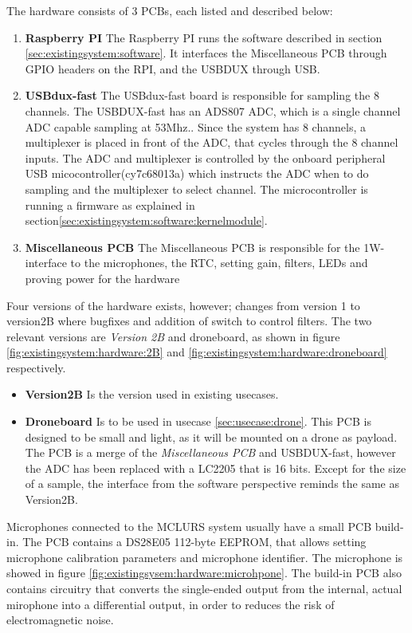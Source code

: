 
The hardware consists of 3 PCBs, each listed and described below:
\begin{enumerate}
	\item \textbf{Raspberry PI} The Raspberry PI runs the software described in section \ref{sec:existingsystem:software}. It interfaces the Miscellaneous PCB through GPIO headers on the RPI, and the USBDUX through USB.
	
	\item \textbf{USBdux-fast} The USBdux-fast board is responsible for sampling the 8 channels. The USBDUX-fast has an ADS807 ADC, which is a single channel ADC capable sampling at 53Mhz..
Since the system has 8 channels, a multiplexer is placed in front of the ADC, that cycles through the 8 channel inputs.
The ADC and multiplexer is controlled by the onboard peripheral USB micocontroller(cy7c68013a) which instructs the ADC when to do sampling and the multiplexer to select channel. The microcontroller is running a firmware as explained in section\ref{sec:existingsystem:software:kernelmodule}.
	
	\item \textbf{Miscellaneous PCB} The Miscellaneous PCB is responsible for the 1W-interface to the microphones, the RTC, setting gain, filters, LEDs and proving power for the hardware
\end{enumerate}

Four versions of the hardware exists, however; changes from version 1 to version2B where bugfixes and addition of switch to control filters. The two relevant versions are \textit{Version 2B} and droneboard, as shown in figure \ref{fig:existingsystem:hardware:2B} and \ref{fig:existingsystem:hardware:droneboard} respectively.

\begin{itemize}
	\item \textbf{Version2B} Is the version used in existing usecases. 

	\item \textbf{Droneboard} Is to be used in usecase \ref{sec:usecase:drone}. This PCB is designed to be small and light, as it will be mounted on a drone as payload. The PCB is a merge of the \textit{Miscellaneous PCB} and USBDUX-fast, however the ADC has been replaced with a LC2205 that is 16 bits. Except for the size of a sample, the interface from the software perspective reminds the same as Version2B.

\end{itemize}
Microphones connected to the MCLURS system usually have a small PCB build-in. The PCB contains a DS28E05 112-byte EEPROM, that allows setting microphone calibration parameters and microphone identifier. The microphone is showed in figure \ref{fig:existingsysem:hardware:microhpone}. The build-in PCB also contains circuitry that converts the single-ended output from the internal, actual mirophone into a differential output, in order to reduces the risk of electromagnetic noise.

